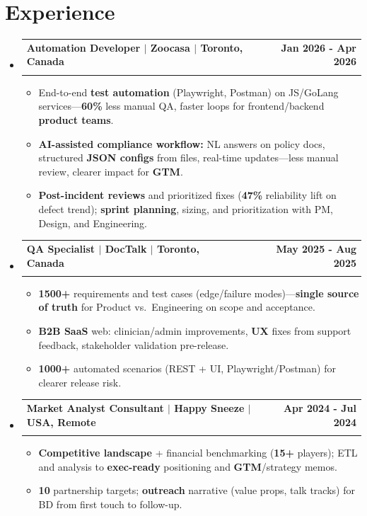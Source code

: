 \documentclass[letterpaper,11pt]{article}
\makeatletter
\newcommand{\resumeItem}[1]{
  \item\small{
    {#1 \vspace{-2pt}}
  }
}
\newcommand{\resumeSubheading}[4]{
  \vspace{-2pt}\item
    \begin{tabular*}{1.0\textwidth}[t]{l@{\extracolsep{\fill}}r}
      \textbf{#1} & \textbf{\small #2} \\
      \textit{\small#3} & \textit{\small#4} \\[-2pt]
    \end{tabular*}\vspace{-2pt}
}
\newcommand{\resumeSubHeadingListStart}{\begin{itemize}[leftmargin=0.0in, label={}]}
\newcommand{\resumeSubHeadingListEnd}{\end{itemize}}
\newcommand{\resumeItemListStart}{\begin{itemize}[leftmargin=0.14in, topsep=0pt, itemsep=0pt, parsep=0pt, partopsep=0pt]}
\newcommand{\resumeItemListEnd}{\end{itemize}\vspace{-2pt}}
\makeatother
\begin{document}
\section{Experience}
    \resumeSubHeadingListStart
    \resumeSubheading
        {Automation Developer $|$ Zoocasa $|$ Toronto, Canada}{Jan 2026 - Apr 2026}
      {}{}
          \resumeItemListStart
            \resumeItem{End-to-end \textbf{test automation} (Playwright, Postman) on JS/GoLang services---\textbf{60\%} less manual QA, faster loops for frontend/backend \textbf{product teams}.}
            \resumeItem{\textbf{AI-assisted compliance workflow:} NL answers on policy docs, structured \textbf{JSON configs} from files, real-time updates---less manual review, clearer impact for \textbf{GTM}.}
            \resumeItem{\textbf{Post-incident reviews} and prioritized fixes (\textbf{47\%} reliability lift on defect trend); \textbf{sprint planning}, sizing, and prioritization with PM, Design, and Engineering.}
          \resumeItemListEnd
      \resumeSubheading
        {QA Specialist $|$ DocTalk $|$ Toronto, Canada}{May 2025 - Aug 2025}
      {}{}
          \resumeItemListStart
            \resumeItem{\textbf{1500+} requirements and test cases (edge/failure modes)---\textbf{single source of truth} for Product vs.\ Engineering on scope and acceptance.}
            \resumeItem{\textbf{B2B SaaS} web: clinician/admin improvements, \textbf{UX} fixes from support feedback, stakeholder validation pre-release.}
            \resumeItem{\textbf{1000+} automated scenarios (REST + UI, Playwright/Postman) for clearer release risk.}
          \resumeItemListEnd
    \resumeSubheading
        {Market Analyst Consultant $|$ Happy Sneeze $|$ USA, Remote}{Apr 2024 - Jul 2024}
        {}{}
          \resumeItemListStart
            \resumeItem{\textbf{Competitive landscape} + financial benchmarking (\textbf{15+} players); ETL and analysis to \textbf{exec-ready} positioning and \textbf{GTM}/strategy memos.}
            \resumeItem{\textbf{10} partnership targets; \textbf{outreach} narrative (value props, talk tracks) for BD from first touch to follow-up.}
          \resumeItemListEnd
   \resumeSubHeadingListEnd

\vspace{-6pt}
\end{document}
